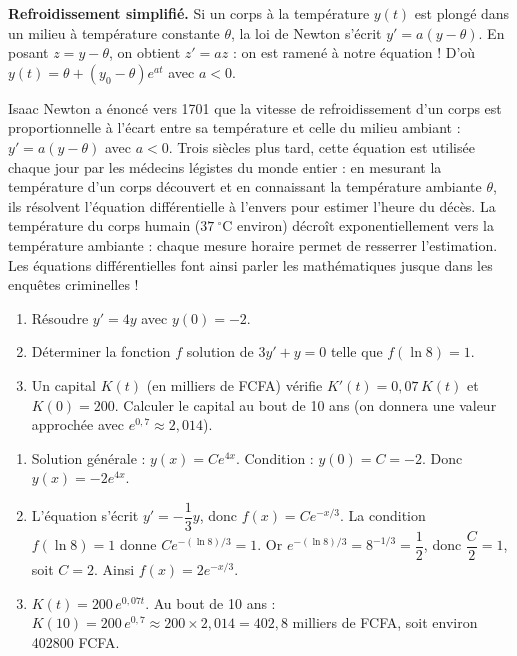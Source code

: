 \documentclass[11pt]{article}
\begin{document}
\textbf{Refroidissement simplifié.} Si un corps à la température $y(t)$ est plongé dans un milieu à température constante $\theta$, la loi de Newton s'écrit $y' = a(y - \theta)$. En posant $z = y - \theta$, on obtient $z' = az$ : on est ramené à notre équation ! D'où $y(t) = \theta + (y_0 - \theta)e^{at}$ avec $a < 0$.

\begin{savaistu}
Isaac Newton a énoncé vers 1701 que la vitesse de refroidissement d'un corps est proportionnelle à l'écart entre sa température et celle du milieu ambiant : $y' = a(y - \theta)$ avec $a < 0$. Trois siècles plus tard, cette équation est utilisée chaque jour par les médecins légistes du monde entier : en mesurant la température d'un corps découvert et en connaissant la température ambiante $\theta$, ils résolvent l'équation différentielle à l'envers pour estimer l'heure du décès. La température du corps humain ($37~^\circ$C environ) décroît exponentiellement vers la température ambiante : chaque mesure horaire permet de resserrer l'estimation. Les équations différentielles font ainsi parler les mathématiques jusque dans les enquêtes criminelles !
\end{savaistu}

\begin{exercice}
\begin{enumerate}
\item Résoudre $y' = 4y$ avec $y(0) = -2$.
\item Déterminer la fonction $f$ solution de $3y' + y = 0$ telle que $f(\ln 8) = 1$.
\item Un capital $K(t)$ (en milliers de FCFA) vérifie $K'(t) = 0,07\, K(t)$ et $K(0) = 200$. Calculer le capital au bout de 10 ans (on donnera une valeur approchée avec $e^{0,7} \approx 2,014$).
\end{enumerate}
\end{exercice}

\begin{corrige}[Exercice]
\begin{enumerate}
\item Solution générale : $y(x) = Ce^{4x}$. Condition : $y(0) = C = -2$. Donc $y(x) = -2e^{4x}$.
\item L'équation s'écrit $y' = -\dfrac{1}{3}y$, donc $f(x) = Ce^{-x/3}$. La condition $f(\ln 8) = 1$ donne $C e^{-(\ln 8)/3} = 1$. Or $e^{-(\ln 8)/3} = 8^{-1/3} = \dfrac{1}{2}$, donc $\dfrac{C}{2} = 1$, soit $C = 2$. Ainsi $f(x) = 2e^{-x/3}$.
\item $K(t) = 200\, e^{0,07t}$. Au bout de 10 ans : $K(10) = 200\, e^{0,7} \approx 200 \times 2,014 = 402,8$ milliers de FCFA, soit environ \num{402800} FCFA.
\end{enumerate}
\end{corrige}
\end{document}
